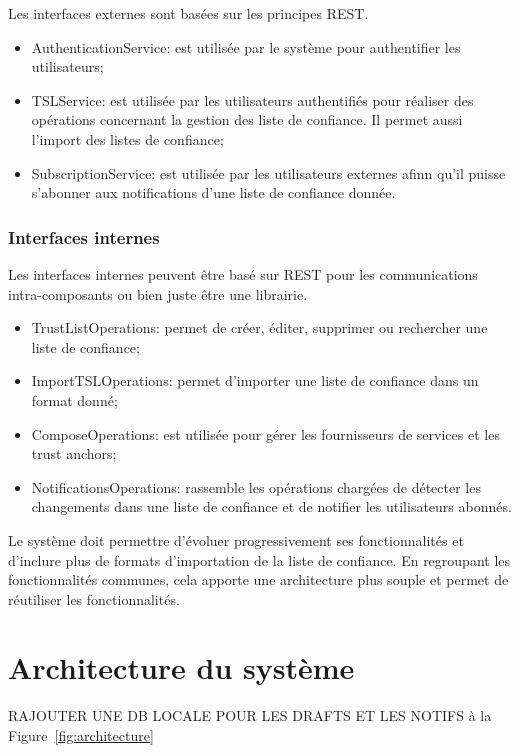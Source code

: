 \documentclass{tnreport}
\begin{document}
Les interfaces externes sont basées sur les principes REST.

\begin{itemize}
	\item AuthenticationService: est utilisée par le système pour authentifier les utilisateurs;
	\item TSLService: est utilisée par les utilisateurs authentifiés pour réaliser des opérations concernant la gestion des liste de confiance. Il permet aussi l'import des listes de confiance;
	\item SubscriptionService: est utilisée par les utilisateurs externes afinn qu'il puisse s'abonner aux notifications d'une liste de confiance donnée.
\end{itemize}

\subsubsection{Interfaces internes}

Les interfaces internes peuvent être basé sur REST pour les communications intra-composants ou bien juste être une librairie.

\begin{itemize}
	\item TrustListOperations: permet de créer, éditer, supprimer ou rechercher une liste de confiance;
	\item ImportTSLOperations: permet d'importer une liste de confiance dans un format donné;
	\item ComposeOperations: est utilisée pour gérer les fournisseurs de services et les trust anchors;
	\item NotificationsOperations: rassemble les opérations chargées de détecter les changements dans une liste de confiance et de notifier les utilisateurs abonnés.
\end{itemize}

Le système doit permettre d'évoluer progressivement ses fonctionnalités et d'inclure plus de formats d'importation de la liste de confiance. En regroupant les fonctionnalités communes, cela apporte une architecture plus souple et permet de réutiliser les fonctionnalités.

\section{Architecture du système}

RAJOUTER UNE DB LOCALE POUR LES DRAFTS ET LES NOTIFS à la Figure~\ref{fig:architecture}
\end{document}
